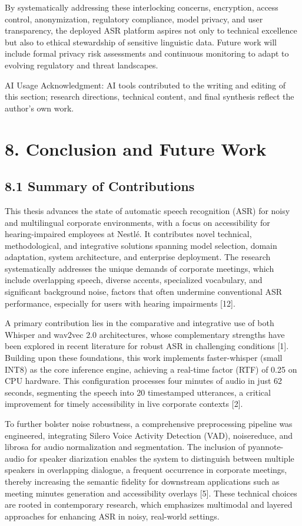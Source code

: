 \documentclass[12pt,a4paper]{article}
\begin{document}
By systematically addressing these interlocking concerns, encryption, access control, anonymization, regulatory compliance, model privacy, and user transparency, the deployed ASR platform aspires not only to technical excellence but also to ethical stewardship of sensitive linguistic data. Future work will include formal privacy risk assessments and continuous monitoring to adapt to evolving regulatory and threat landscapes.


AI Usage Acknowledgment: AI tools contributed to the writing and editing of this section; research directions, technical content, and final synthesis reflect the author’s own work.


\section{8. Conclusion and Future Work}


\subsection{8.1 Summary of Contributions}


This thesis advances the state of automatic speech recognition (ASR) for noisy and multilingual corporate environments, with a focus on accessibility for hearing-impaired employees at Nestlé. It contributes novel technical, methodological, and integrative solutions spanning model selection, domain adaptation, system architecture, and enterprise deployment. The research systematically addresses the unique demands of corporate meetings, which include overlapping speech, diverse accents, specialized vocabulary, and significant background noise, factors that often undermine conventional ASR performance, especially for users with hearing impairments [12].


A primary contribution lies in the comparative and integrative use of both Whisper and wav2vec 2.0 architectures, whose complementary strengths have been explored in recent literature for robust ASR in challenging conditions [1]. Building upon these foundations, this work implements faster-whisper (small INT8) as the core inference engine, achieving a real-time factor (RTF) of 0.25 on CPU hardware. This configuration processes four minutes of audio in just 62 seconds, segmenting the speech into 20 timestamped utterances, a critical improvement for timely accessibility in live corporate contexts [2].


To further bolster noise robustness, a comprehensive preprocessing pipeline was engineered, integrating Silero Voice Activity Detection (VAD), noisereduce, and librosa for audio normalization and segmentation. The inclusion of pyannote-audio for speaker diarization enables the system to distinguish between multiple speakers in overlapping dialogue, a frequent occurrence in corporate meetings, thereby increasing the semantic fidelity for downstream applications such as meeting minutes generation and accessibility overlays [5]. These technical choices are rooted in contemporary research, which emphasizes multimodal and layered approaches for enhancing ASR in noisy, real-world settings.
\end{document}
